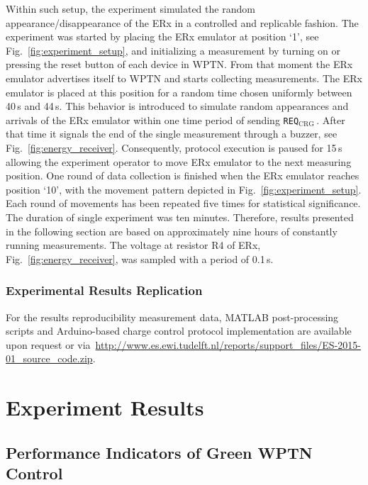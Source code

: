 \documentclass[11pt,draftclsnofoot,journal,onecolumn]{IEEEtran}
\newcommand{\textsubscript}[1]{$_{\text{#1}}$}
\newcommand{\chargingRequest}{\texttt{REQ\textsubscript{CRG}}\,}
\begin{document}
Within such setup, the experiment simulated the random appearance/disappearance of the ERx in a controlled and replicable fashion. The experiment was started by placing the ERx emulator at position `1', see Fig.~\ref{fig:experiment_setup}, and initializing a measurement by turning on or pressing the reset button of each device in WPTN. From that moment the ERx emulator advertises itself to WPTN and starts collecting measurements. The ERx emulator is placed at this position for a random time chosen uniformly between 40\,s and 44\,s. This behavior is introduced to simulate random appearances and arrivals of the ERx emulator within one time period of sending \chargingRequest. After that time it signals the end of the single measurement through a buzzer, see Fig.~\ref{fig:energy_receiver}. Consequently, protocol execution is paused for 15\,s allowing the experiment operator to move ERx emulator to the next measuring position. One round of data collection is finished when the ERx emulator reaches position `10', with the movement pattern depicted in Fig.~\ref{fig:experiment_setup}. Each round of movements has been repeated five times for statistical significance. The duration of single experiment was ten minutes. Therefore, results presented in the following section are based on approximately nine hours of constantly running measurements. The voltage at resistor R4 of ERx, Fig.~\ref{fig:energy_receiver}, was sampled with a period of 0.1\,s.

\subsubsection{Experimental Results Replication}
\label{sec:experiment_result_replication}

For the results reproducibility measurement data, MATLAB post-processing scripts and Arduino-based charge control protocol implementation are available upon request or via~\url{http://www.es.ewi.tudelft.nl/reports/support_files/ES-2015-01_source_code.zip}.

\section{Experiment Results}
\label{sec:experiment_result}

\subsection{Performance Indicators of Green WPTN Control}
\label{sec:performance_descriptors}
\end{document}

